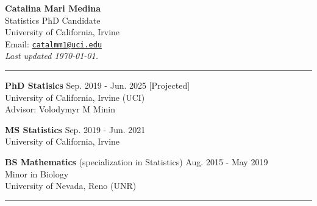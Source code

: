 \documentclass{article}
\makeatletter
\newcommand{\myname}{Catalina Mari Medina}
\newcommand{\myemail}{catalmm1@uci.edu}
\newcommand{\myhomeaddress}{Statistics PhD Candidate\\ %
	 University of California, Irvine \\ 
	 Email: \texttt{\href{mailto:\myemail}{\myemail}}
 }
\makeatother
\begin{document}
\thispagestyle{empty}
\phantom{.}\vspace{-2cm}
\begin{center}
	{\huge \bf \myname}\\
	\myhomeaddress\\
	\emph{Last updated {\today}.}
\end{center}

\vspace{-4mm}
\rule{\linewidth}{1pt}


\begin{description}
	\vspace{-2mm}
	\item[Education]\hspace*{.1in}
	
		\textbf{PhD Statisics} \hfill{Sep. 2019 - Jun. 2025 [Projected]} \\
		University of California, Irvine (UCI)\\ 
		Advisor: Volodymyr M Minin
		\vspace*{1mm}
		
		\textbf{MS Statistics} \hfill{Sep. 2019 - Jun. 2021}\\
		University of California, Irvine
		\vspace*{1mm}
		
		\textbf{BS Mathematics} (specialization in Statistics) \hfill{Aug. 2015 - May 2019} \\
		Minor in Biology\\
		University of Nevada, Reno (UNR)
		
\end{description}
\vspace{-2mm}
\rule{\linewidth}{1pt}
\end{document}
